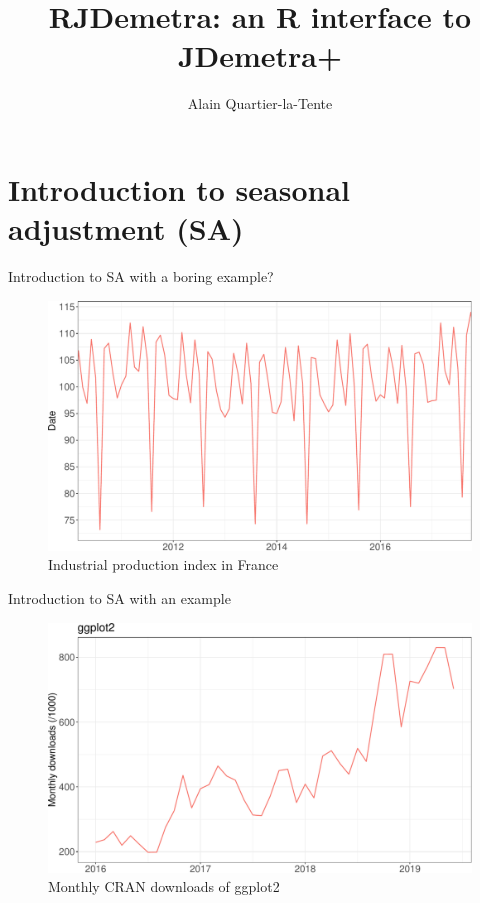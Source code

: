 \documentclass[10pt,xcolor=table,color={dvipsnames,usenames},ignorenonframetext,usepdftitle=false,french]{beamer}
\title{RJDemetra: an R interface to JDemetra+}
\author{Alain Quartier-la-Tente}
\date{}
\begin{document}
\begin{frame}
\titlepage
\end{frame}

\hypertarget{introduction-to-seasonal-adjustment-sa}{%
\section{Introduction to seasonal adjustment
(SA)}\label{introduction-to-seasonal-adjustment-sa}}

\begin{frame}{Introduction to SA with a boring example? \bcsmmh}
\protect\hypertarget{introduction-to-sa-with-a-boring-example}{}

\begin{figure}
\centering
\includegraphics{img/markdown-unnamed-chunk-1-1.pdf}
\caption{Industrial production index in France}
\end{figure}

\end{frame}

\begin{frame}{Introduction to SA with an \faRProject{} example}
\protect\hypertarget{introduction-to-sa-with-an-example}{}

\begin{figure}
\centering
\includegraphics{img/markdown-unnamed-chunk-2-1.pdf}
\caption{Monthly CRAN downloads of ggplot2}
\end{figure}

\end{frame}
\end{document}
